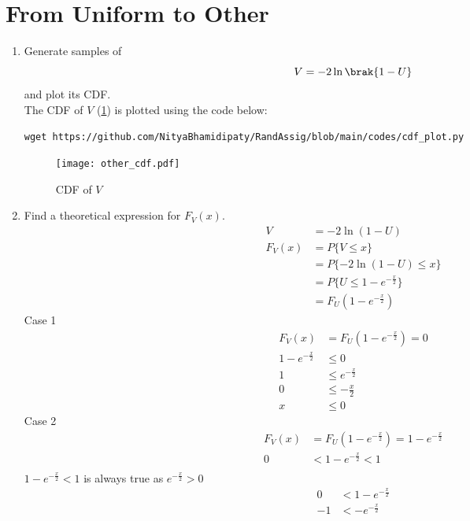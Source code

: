 \documentclass[journal,12pt,twocolumn]{IEEEtran}
\renewcommand\thesection{\arabic{section}}
\begin{document}
\section{From Uniform to Other}
\begin{enumerate}[label=\thesection.\arabic*
,ref=\thesection.\theenumi]
%
\item
Generate samples of 
%
\begin{equation}
V = -2\ln\brak{1-U}
\end{equation}
%
and plot its CDF.  \\
\solution
The CDF of $V$ (\ref{fig:other_cdf}) is plotted using the code below:
\begin{lstlisting}
wget https://github.com/NityaBhamidipaty/RandAssig/blob/main/codes/cdf_plot.py
\end{lstlisting}
\begin{figure}
    \centering
    \texttt{[image: other\_cdf.pdf]}
    \caption{CDF of $V$}
    \label{fig:other_cdf}
\end{figure}
\item Find a theoretical expression for $F_V(x)$.\\
\solution
\begin{align}
    V &= -2\ln(1-U)\\
    F_V(x) &= P\{V\le x\}\\
    &= P\{-2\ln(1-U)\le x\}\\
    &= P\{U\le1-e^{-\frac{x}{2}}\}\\
    &= F_U(1-e^{-\frac{x}{2}})
\end{align}
Case 1
\begin{align}
    F_V(x) &= F_U(1-e^{-\frac{x}{2}}) = 0\\
    1-e^{-\frac{x}{2}} &\le 0\\
    1 &\le e^{-\frac{x}{2}}\\
    0 &\le -\frac{x}{2}\\
    x &\le 0
\end{align}
Case 2
\begin{align}
    F_V(x) &= F_U(1-e^{-\frac{x}{2}}) = 1-e^{-\frac{x}{2}}\\
    0 &< 1-e^{-\frac{x}{2}} < 1 \\
\end{align}
$1-e^{-\frac{x}{2}} < 1$ is always true as $e^{-\frac{x}{2}} > 0$
\begin{align}
    0 &< 1-e^{-\frac{x}{2}}\\
    -1 &< -e^{-\frac{x}{2}}\\

\end{align}
\end{enumerate}
\end{document}
